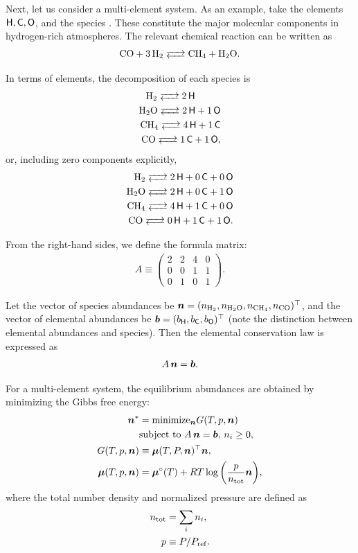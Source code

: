 Next, let us consider a multi-element system.  
As an example, take the elements $\mathsf{H}, \mathsf{C}, \mathsf{O}$, and the species . These constitute the major molecular components in hydrogen-rich atmospheres. The relevant chemical reaction can be written as
\begin{align*}
\ce{CO + 3 H2 <--> CH4 + H2O}.
\end{align*}

In terms of elements, the decomposition of each species is
\begin{align*}
\ce{H2 <--> 2 $\Hel$ \, \, \, \, \, \, \, \, \\
H2O <--> 2 $\Hel$ + 1 $\Oel$ \\
CH4 <--> 4 $\Hel$ + 1 $\Cel$ \\
CO <-->  1 $\Cel$ + 1 $\Oel$},
\end{align*}
or, including zero components explicitly,
\begin{align*}
\ce{H2 <--> 2 $\Hel$ + 0 $\Cel$ + 0 $\Oel$ \\
H2O <--> 2 $\Hel$ + 0 $\Cel$ + 1 $\Oel$ \\
CH4 <--> 4 $\Hel$ + 1 $\Cel$ + 0 $\Oel$ \\
CO <--> 0 $\Hel$ + 1 $\Cel$ + 1 $\Oel$ }.
\end{align*}

From the right-hand sides, we define the formula matrix:
\begin{align*}
  A \equiv
\begin{pmatrix} 
2 & 2 & 4 & 0 \\
0 & 0 & 1 & 1 \\
0 & 1 & 0 & 1 
\end{pmatrix}.
\end{align*}

Let the vector of species abundances be $\boldsymbol{n} = (n_\mathrm{H_2}, n_\mathrm{H_2 O},n_\mathrm{CH_4},n_\mathrm{CO})^\top$, and the vector of elemental abundances be $\boldsymbol{b} = (b_{\mathsf{H}}, b_{\mathsf{C}}, b_{\mathsf{O}})^\top$ (note the distinction between elemental abundances and species). Then the elemental conservation law is expressed as
\begin{align}
    A \, \boldsymbol{n} = \boldsymbol{b}.
\end{align}

For a multi-element system, the equilibrium abundances are obtained by minimizing the Gibbs free energy:
\begin{align}
\label{eq:gibss_multi}
    \boldsymbol{n}^\ast &= \mathrm{minimize}_{\boldsymbol{n}} G(T, p, \boldsymbol{n}) \nonumber \\
    &\mbox{subject to} \,\, A \, \boldsymbol{n} = \boldsymbol{b}, \, n_i \ge 0, \\
    G(T, p, \boldsymbol{n}) &\equiv  \boldsymbol{\mu} (T, P, \boldsymbol{n})^\top \boldsymbol{n}, \\ 
    \label{eq:chemical_potential_mu}
    \boldsymbol{\mu} (T, p, \boldsymbol{n}) &=  \boldsymbol{\mu}^\circ(T) + RT \log{\left(\frac{p}{n_\mathrm{tot}} \boldsymbol{n}\right)} ,
\end{align}
where the total number density and normalized pressure are defined as
\begin{align}
\label{eq:ntot_tce}
    n_\mathrm{tot} &= \sum_i n_i, \\
    p &\equiv P/P_\mathrm{ref}.
\end{align}


